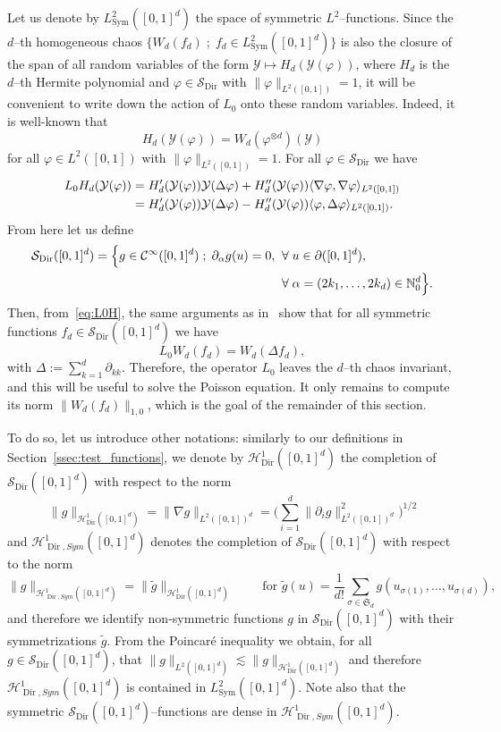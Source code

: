 \documentclass[AHL,Unicode,longabstracts]{cedram}
\DeclareMathOperator{\Dir}{Dir}
\DeclareMathOperator{\Sym}{Sym}
\newcommand{\bb}[1]{{\mathbb #1}}
\newcommand{\mc}[1]{{\mathcal #1}}
\renewcommand{\mc}[1]{{\mathcal #1}}
\newcommand{\Ctwo}{\ensuremath{\mc S_{\Dir}}}
\newcommand{\SD}{\ensuremath{\mc S_{\Dir}}}
\let\oldforall\forall
\renewcommand*{\forall}{\mathrel{\oldforall}}
\begin{document}

Let us denote by $L^2_{\Sym}([0,1]^d)$ the space of symmetric $L^2$--functions. Since the $d$--th homogeneous chaos $\{W_d(f_d) \; ; \; f_d \in L^2_{\Sym}([0,1]^d)\}$ is also the closure of the span of all random variables of the form $\mc Y \mapsto H_d(\mc Y(\varphi))$, where $H_d$ is the $d$--th Hermite polynomial and $\varphi \in \SD$ with $\|\varphi\|_{L^2([0,1])}=1$, it will be convenient to write down the action of $L_0$ onto these random variables. Indeed, it is well-known that
\[
H_d(\mc Y(\varphi)) = W_d(\varphi^{\otimes d})(\mc Y)
\]
for all $\varphi \in L^2([0,1])$ with $\|\varphi\|_{L^2([0,1])} = 1$. For all $\varphi \in
\Ctwo$ we have
\begin{align}
\notag L_0 H_d (\mc Y(\varphi)) & = H'_d (\mc Y(\varphi)) \mc Y(\Delta \varphi) + H''_d (\mc Y(\varphi)) \langle \nabla \varphi, \nabla \varphi \rangle_{L^2 ([0, 1])}\\
& = H'_d (\mc Y(\varphi)) \mc Y(\Delta \varphi) - H''_d (\mc Y(\varphi))
\langle \varphi, \Delta \varphi \rangle_{L^2 ([0, 1])}. \label{eq:L0H}
\end{align}
From here let us define
\begin{align*}
\mc \SD ([0, 1]^d) = \Big\{ g \in \mc C^\infty ([0, 1]^d) \; ; \; \partial_\alpha g(u) = 0, \; &\forall u \in \partial ([0, 1]^d),
\\ &\forall \alpha=(2k_1,\dots, 2k_d) \in \bb N_0^d \Big\}.
\end{align*}
Then, from~\eqref{eq:L0H}, the same arguments as in~\cite[Lemma~3.7]{Gubinelli2015Energy} show that for all symmetric functions $ f_d \in \SD ([0, 1]^d) $ we have
\begin{equation}\label{eq:L0W}
L_0 W_d (f_d) = W_d (\Delta f_d),
\end{equation}
with $\Delta := \sum_{k = 1}^d \partial_{kk}$. Therefore, the operator $L_0$ leaves the $d$--th chaos invariant, and this will be useful to solve the Poisson equation. It only remains to compute its norm $\|W_d(f_d)\|_{1,0}$, which is the goal of the remainder of this section.

To do so, let us introduce other notations: similarly to our definitions in Section~\ref{ssec:test_functions}, we denote by $\mc H_{\Dir}^1 ([0, 1]^d)$ the completion of $ \SD ([0, 1]^d)$ with respect to the norm
\[
\|g\|_{\mc H_{\Dir}^1 ([0, 1]^d)} = \| \nabla g\|_{L^2([0,1])^d} = \bigg(\sum_{i=1}^d \|\partial_{i} g\|_{L^2([0,1])^d}^2\bigg)^{1/2}
\]
and $\mc H_{\Dir,Sym}^1([0, 1]^d)$ denotes the completion of $\SD ([0, 1]^d)$ with respect to the norm
\[
\| g \|_{\mc H_{\Dir,Sym}^1([0, 1]^d)}= \| \widetilde{g} \|_{\mc H_{\Dir}^1([0, 1]^d)} \qquad \text{ for } \widetilde{g} (u) = \frac{1}{d!} \sum_{\sigma \in \mathfrak{S}_d} g (u_{\sigma (1)}, \ldots, u_{\sigma (d)}),
\]
and therefore we identify non-symmetric functions $g$ in $\SD ([0, 1]^d)$ with their symmetrizations $\widetilde g$. From the Poincar\'e inequality we obtain, for all $g \in \SD ([0, 1]^d)$, that $\| g \|_{L^2 ([0, 1]^d)} \lesssim \| g \|_{\mc H_{\Dir}^1([0, 1]^d)}$ and therefore $\mc H_{\Dir,Sym}^1([0, 1]^d)$ is contained in $L^2_{\Sym} ([0, 1]^d)$. Note also that the symmetric $\mc S_{\Dir}([0,1]^d)$--functions are dense in $\mc H_{\Dir,Sym}^1([0, 1]^d)$.
\end{document}
